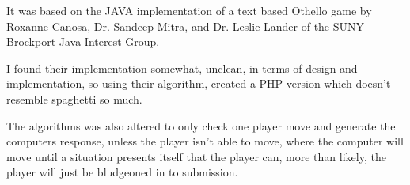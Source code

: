 \items	It was based on the JAVA implementation of a text based Othello game by Roxanne Canosa, Dr. Sandeep Mitra, and Dr. Leslie Lander of the SUNY-Brockport Java Interest Group.

\items	I found their implementation somewhat, unclean, in terms of design and implementation, so using their algorithm, created a PHP version which doesn't resemble spaghetti so much.

\items	The algorithms was also altered to only check one player move and generate the computers response, unless the player isn't able to move, where the computer will move until a situation presents itself that the player can, more than likely, the player will just be bludgeoned in to submission.


\bye
